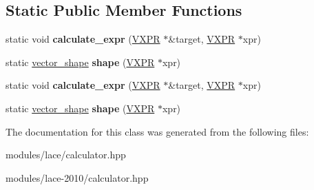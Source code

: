 \subsection*{Static Public Member Functions}
\begin{DoxyCompactItemize}
\item 
\hypertarget{class__lace__expressions_1_1__summa__specific_3_01VALTYPE_00_01vector__expression_3_01VALTYPE_01_4_01_4_a31166192b0a47115afd68740e026bb56}{static void {\bfseries calculate\-\_\-expr} (\hyperlink{class__lace__expressions_1_1vector__expression}{V\-X\-P\-R} $\ast$\&target, \hyperlink{class__lace__expressions_1_1vector__expression}{V\-X\-P\-R} $\ast$xpr)}\label{class__lace__expressions_1_1__summa__specific_3_01VALTYPE_00_01vector__expression_3_01VALTYPE_01_4_01_4_a31166192b0a47115afd68740e026bb56}

\item 
\hypertarget{class__lace__expressions_1_1__summa__specific_3_01VALTYPE_00_01vector__expression_3_01VALTYPE_01_4_01_4_aaec12df40b27e4ffe20b510728b96f58}{static \hyperlink{struct__lace__storage_1_1vector__shape}{vector\-\_\-shape} {\bfseries shape} (\hyperlink{class__lace__expressions_1_1vector__expression}{V\-X\-P\-R} $\ast$xpr)}\label{class__lace__expressions_1_1__summa__specific_3_01VALTYPE_00_01vector__expression_3_01VALTYPE_01_4_01_4_aaec12df40b27e4ffe20b510728b96f58}

\item 
\hypertarget{class__lace__expressions_1_1__summa__specific_3_01VALTYPE_00_01vector__expression_3_01VALTYPE_01_4_01_4_a31166192b0a47115afd68740e026bb56}{static void {\bfseries calculate\-\_\-expr} (\hyperlink{class__lace__expressions_1_1vector__expression}{V\-X\-P\-R} $\ast$\&target, \hyperlink{class__lace__expressions_1_1vector__expression}{V\-X\-P\-R} $\ast$xpr)}\label{class__lace__expressions_1_1__summa__specific_3_01VALTYPE_00_01vector__expression_3_01VALTYPE_01_4_01_4_a31166192b0a47115afd68740e026bb56}

\item 
\hypertarget{class__lace__expressions_1_1__summa__specific_3_01VALTYPE_00_01vector__expression_3_01VALTYPE_01_4_01_4_aaec12df40b27e4ffe20b510728b96f58}{static \hyperlink{struct__lace__storage_1_1vector__shape}{vector\-\_\-shape} {\bfseries shape} (\hyperlink{class__lace__expressions_1_1vector__expression}{V\-X\-P\-R} $\ast$xpr)}\label{class__lace__expressions_1_1__summa__specific_3_01VALTYPE_00_01vector__expression_3_01VALTYPE_01_4_01_4_aaec12df40b27e4ffe20b510728b96f58}

\end{DoxyCompactItemize}


The documentation for this class was generated from the following files\-:\begin{DoxyCompactItemize}
\item 
modules/lace/calculator.\-hpp\item 
modules/lace-\/2010/calculator.\-hpp\end{DoxyCompactItemize}
